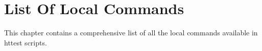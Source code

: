 
\newpage
\chapter{List Of Local Commands}
\label{chap:localCommandsList}

This chapter contains a comprehensive list of all the local 
commands available in httest scripts.
